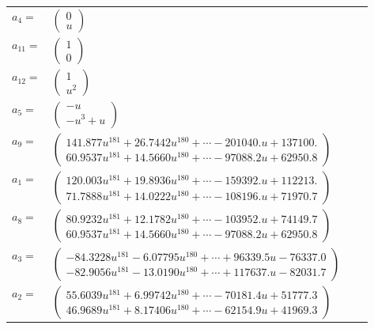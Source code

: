 \documentclass[1p]{elsarticle_modified}
\theoremstyle{definition}
\begin{document}
\begin{tabular}{m{7pt} m{180pt} m{7pt} m{180pt} }
\flushright $a_{4}=$&$\begin{pmatrix}0\\u\end{pmatrix}$ \\
\flushright $a_{11}=$&$\begin{pmatrix}1\\0\end{pmatrix}$ \\
\flushright $a_{12}=$&$\begin{pmatrix}1\\u^2\end{pmatrix}$ \\
\flushright $a_{5}=$&$\begin{pmatrix}- u\\- u^3+u\end{pmatrix}$ \\
\flushright $a_{9}=$&$\begin{pmatrix}141.877 u^{181}+26.7442 u^{180}+\cdots-201040. u+137100.\\60.9537 u^{181}+14.5660 u^{180}+\cdots-97088.2 u+62950.8\end{pmatrix}$ \\
\flushright $a_{1}=$&$\begin{pmatrix}120.003 u^{181}+19.8936 u^{180}+\cdots-159392. u+112213.\\71.7888 u^{181}+14.0222 u^{180}+\cdots-108196. u+71970.7\end{pmatrix}$ \\
\flushright $a_{8}=$&$\begin{pmatrix}80.9232 u^{181}+12.1782 u^{180}+\cdots-103952. u+74149.7\\60.9537 u^{181}+14.5660 u^{180}+\cdots-97088.2 u+62950.8\end{pmatrix}$ \\
\flushright $a_{3}=$&$\begin{pmatrix}-84.3228 u^{181}-6.07795 u^{180}+\cdots+96339.5 u-76337.0\\-82.9056 u^{181}-13.0190 u^{180}+\cdots+117637. u-82031.7\end{pmatrix}$ \\
\flushright $a_{2}=$&$\begin{pmatrix}55.6039 u^{181}+6.99742 u^{180}+\cdots-70181.4 u+51777.3\\46.9689 u^{181}+8.17406 u^{180}+\cdots-62154.9 u+41969.3\end{pmatrix}$ \\

\end{tabular}
\end{document}
